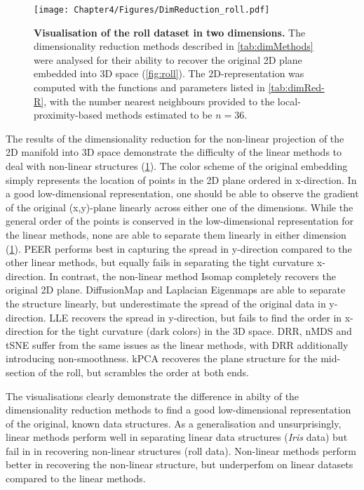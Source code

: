 \begin{figure}[hbtp]
	\centering
	\texttt{[image: Chapter4/Figures/DimReduction\_roll.pdf]}
	\caption[\textbf{Visualisation of the roll dataset in two dimensions.}]{\textbf{Visualisation of the roll dataset in two dimensions.} The dimensionality reduction methods described in \cref{tab:dimMethods} were analysed for their ability to recover the original 2D plane embedded into 3D space (\cref{fig:roll}). The 2D-representation was computed with the functions and parameters listed in \cref{tab:dimRed-R}, with the number nearest neighbours provided to the local-proximity-based methods estimated to be \(n=36\). } 
	 	\label{fig:dimRed-roll}
\end{figure}


The results of the dimensionality reduction for the non-linear projection of the 2D manifold into 3D space demonstrate the difficulty of the linear methods to deal with non-linear structures (\cref{fig:dimRed-roll}). The color scheme of the original embedding simply represents the location of points in the 2D plane ordered in x-direction. In a good low-dimensional representation, one should be able to observe the gradient of the original (x,y)-plane linearly across either one of the dimensions. While the general order of the points is conserved in the low-dimensional representation for the linear methods, none are able to separate them linearly in either dimension (\cref{fig:dimRed-roll}). PEER performs best in capturing the spread in y-direction compared to the other linear methods, but equally fails in separating the tight curvature x-direction. In contrast, the non-linear method Isomap completely recovers the original 2D plane. DiffusionMap and Laplacian Eigenmaps are able to separate the structure linearly, but underestimate the spread of the original data in y-direction. LLE recovers the spread in y-direction, but fails to find the order in x-direction for the tight curvature (dark colors) in the 3D space. DRR, nMDS and tSNE suffer from the same issues as the linear methods, with DRR additionally introducing non-smoothness. kPCA recoveres the plane structure for the mid-section of the roll, but scrambles the order at both ends. 

The visualisations clearly demonstrate the difference in abilty of the dimensionality reduction methods to find a good low-dimensional representation of the original, known data structures. As a generalisation and unsurprisingly, linear methods perform well in separating linear data structures (\textit{Iris} data) but fail in in recovering non-linear structures (roll data). Non-linear methods perform better in recovering the non-linear structure, but underperfom on linear datasets compared to the linear methods. 

